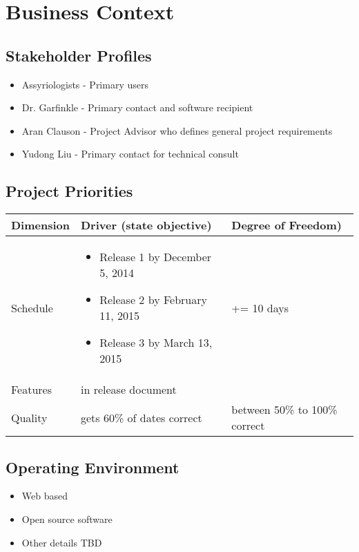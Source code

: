 \documentclass[11pt]{article}
\begin{document}
\section{Business Context}
\subsection{Stakeholder Profiles}
\begin{itemize}
    \item Assyriologists - Primary users
    \item Dr. Garfinkle - Primary contact and software recipient
    \item Aran Clauson - Project Advisor who defines general project requirements
    \item Yudong Liu - Primary contact for technical consult
\end{itemize}

\subsection{Project Priorities}
\begin{tabularx}{\textwidth}{|l|X|l|}
    \hline
    \textbf{Dimension} & \textbf{Driver (state objective)} & \textbf{Degree of Freedom)} \\
    \hline
    Schedule &
        \begin{itemize}
            \item Release 1 by December 5, 2014
            \item Release 2 by February 11, 2015
            \item Release 3 by March 13, 2015
        \end{itemize}
    & += 10 days \\
    \hline
    Features & in release document & \\
    \hline
    Quality & gets 60\% of dates correct & between 50\% to 100\% correct \\
    \hline
\end{tabularx}

\subsection{Operating Environment}
\begin{itemize}
    \item Web based
    \item Open source software
    \item Other details TBD
\end{itemize}
\end{document}
